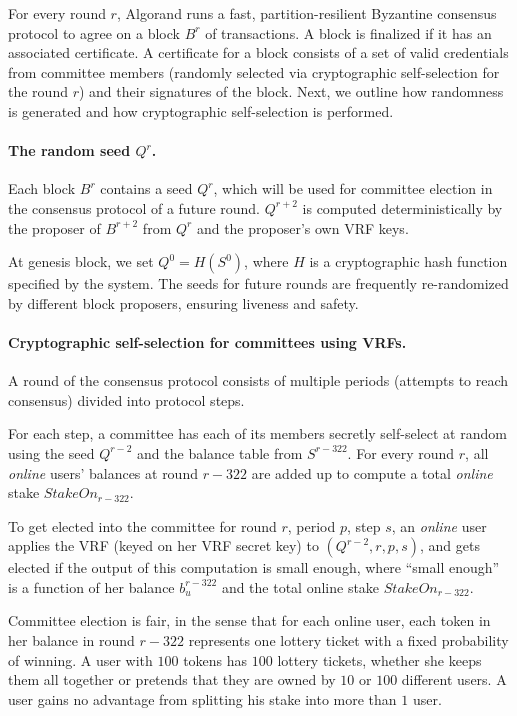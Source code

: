 \documentclass[../main.tex]{subfiles}
\begin{document}
For every round $r$, Algorand runs a fast, partition-resilient Byzantine consensus protocol to agree on a block $B^r$ of transactions. 
A block is finalized if it has an associated certificate. 
A certificate for a block consists of a set of valid 
credentials from committee members (randomly selected via cryptographic self-selection for the round $r$) and their signatures of the block.  
Next, we outline how randomness is generated and how cryptographic self-selection is performed. 

\paragraph{The random seed $Q^r$.} 
Each block $B^r$ contains a seed $Q^r$, which will be used for committee election in the consensus protocol of a future round. $Q^{r+2}$ is computed deterministically by the proposer of $B^{r+2}$ from $Q^r$ and the proposer's own VRF keys.

At genesis block, we set $Q^0 = H(S^0)$, where $H$ is a cryptographic hash function specified by the system.
The seeds for future rounds are frequently re-randomized by different block proposers, ensuring liveness and safety.

\paragraph{Cryptographic self-selection for committees using VRFs.}
A round of the consensus protocol consists of multiple periods (attempts to reach consensus) divided into protocol steps.

For each step, a committee has each of its members secretly self-select at random using the seed $Q^{r-2}$ and the balance table from $S^{r-322}$. 
For every round $r$, all {\em online} users' balances at round $r-322$ are added up to compute a total \emph{online} stake $StakeOn_{r-322}$.

To get elected into the committee for round $r$, period $p$, step $s$, an \emph{online} user applies the VRF (keyed on her VRF secret key) to $(Q^{r-2}, r, p, s)$, and gets elected if the output of this computation is small enough, where ``small enough'' is a function of her balance $b_u^{r-322}$ and the total online stake $StakeOn_{r-322}$.

Committee election is fair, in the sense that for each online user, each token in her balance in round $r-322$ represents one lottery ticket with a fixed probability of winning. 
A user with $100$ tokens has $100$ lottery tickets, whether she keeps them all together or pretends that they are owned by $10$ or $100$ different users. 
A user gains no advantage from splitting his stake into more than $1$ user.
\end{document}

